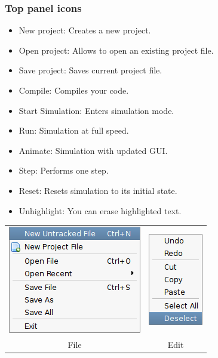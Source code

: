     \subsubsection{Top panel icons}
        \begin{itemize}
            \item New project: Creates a new project.
            \item Open project: Allows to open an existing project file.
            \item Save project: Saves current project file.
            \item Compile: Compiles your code.
            \item Start Simulation: Enters simulation mode.
            \item Run: Simulation at full speed.
            \item Animate: Simulation with updated GUI.
            \item Step: Performs one step.
            \item Reset: Resets simulation to its initial state.
            \item Unhighlight: You can erase highlighted text.
        \end{itemize}

        
    \begin{table}[h!]
        \begin{tabular}{cc}
            \includegraphics[width=.25\textwidth]{img/NewImg/file.png}
                &
            \includegraphics[width=.25\textwidth]{img/NewImg/edit.png}
                \\
            File & Edit
        \end{tabular}
    \end{table}


